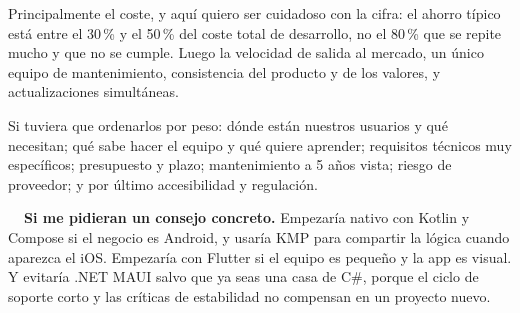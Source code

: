  Principalmente el coste, y aquí quiero ser cuidadoso con la cifra: el ahorro típico está entre el 30\,\% y el 50\,\% del coste total de desarrollo, no el 80\,\% que se repite mucho y que no se cumple. Luego la velocidad de salida al mercado, un único equipo de mantenimiento, consistencia del producto y de los valores, y actualizaciones simultáneas.


Si tuviera que ordenarlos por peso: dónde están nuestros usuarios y qué necesitan; qué sabe hacer el equipo y qué quiere aprender; requisitos técnicos muy específicos; presupuesto y plazo; mantenimiento a 5 años vista; riesgo de proveedor; y por último accesibilidad y regulación.

\begin{ideabox}
\textbf{\color{mint!70!black}\faLightbulb\ \ Si me pidieran un consejo concreto.}
Empezaría nativo con Kotlin y Compose si el negocio es Android, y usaría KMP para compartir la lógica cuando aparezca el iOS. Empezaría con Flutter si el equipo es pequeño y la app es visual. Y evitaría .NET MAUI salvo que ya seas una casa de C\#, porque el ciclo de soporte corto y las críticas de estabilidad no compensan en un proyecto nuevo.
\end{ideabox}